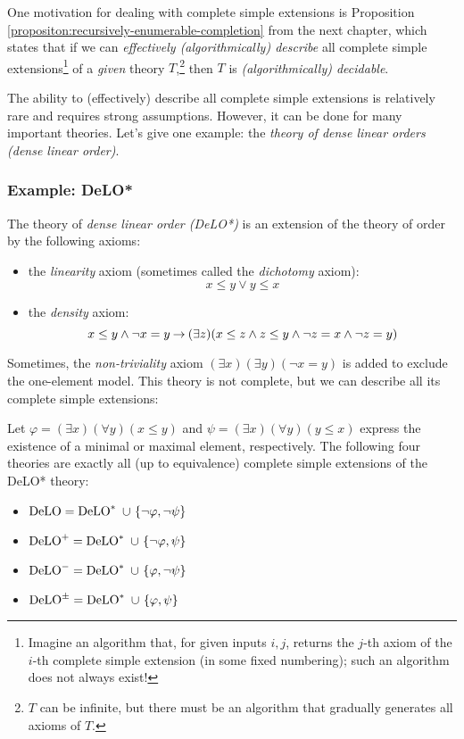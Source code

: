 \begin{remark}
    One motivation for dealing with complete simple extensions is Proposition \ref{propositon:recursively-enumerable-completion} from the next chapter, which states that if we can \emph{effectively (algorithmically) describe} all complete simple extensions\footnote{Imagine an algorithm that, for given inputs $i,j$, returns the $j$-th axiom of the $i$-th complete simple extension (in some fixed numbering); such an algorithm does not always exist!} of a \emph{given} theory $T$,\footnote{$T$ can be infinite, but there must be an algorithm that gradually generates all axioms of $T$.} then $T$ is \emph{(algorithmically) decidable}.
\end{remark}

The ability to (effectively) describe all complete simple extensions is relatively rare and requires strong assumptions. However, it can be done for many important theories. Let's give one example: the \emph{theory of dense linear orders (dense linear order)}.

\subsubsection{Example: DeLO*}

The theory of \emph{dense linear order (DeLO*)} is an extension of the theory of order by the following axioms:
\begin{itemize}
    \item the \emph{linearity} axiom (sometimes called the \emph{dichotomy} axiom):
    $$
    x \leq y \lor y \leq x
    $$
    \item the \emph{density} axiom:
    $$
    {x \leq y} \land {\neg x = y} \mathbin{\rightarrow} (\exists z)(x \leq z \land z \leq y \land \neg z = x \land \neg z = y)
    $$
\end{itemize}
Sometimes, the \emph{non-triviality} axiom $(\exists x)(\exists y)(\neg x = y)$ is added to exclude the one-element model. This theory is not complete, but we can describe all its complete simple extensions:

\begin{proposition}
Let $\varphi = (\exists x)(\forall y)(x \leq y)$ and $\psi = (\exists x)(\forall y)(y \leq x)$ express the existence of a minimal or maximal element, respectively. The following four theories are exactly all (up to equivalence) complete simple extensions of the DeLO* theory:
\begin{itemize}
    \item $\DeLO = \DeLO^* \ \cup \ \{\neg\varphi, \neg\psi\}$
    \item $\DeLO^+ = \DeLO^* \ \cup \ \{\neg\varphi, \psi\}$
    \item $\operatorname{DeLO}^- = \operatorname{DeLO}^* \ \cup \ \{\varphi, \neg\psi\}$
    \item $\DeLO^\pm = \DeLO^* \ \cup \ \{\varphi, \psi\}$        
\end{itemize}
\end{proposition}

